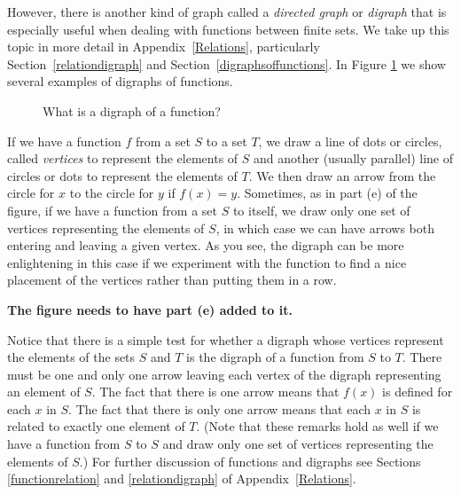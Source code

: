 However, there is another kind of graph called a {\em directed
  graph} or {\em
  digraph} that is
especially useful when dealing with functions between finite sets. We
take up this topic in more detail in Appendix~\ref{Relations},
particularly Section~\ref{relationdigraph} and Section~\ref{digraphsoffunctions}. In
Figure \ref{functiondigraphs} we show several examples of digraphs of functions.
\begin{figure}[hbt]\caption{What is a digraph of a
function?}\label{functiondigraphs}\smallskip
\begin{center}\end{center}
\end{figure}
If we have a function $f$ from a set $S$ to a set $T$, we draw a line
of dots or circles, called \emph{vertices} to represent the elements of $S$ and another
(usually parallel) line of circles or dots to represent the elements
of $T$.  We then draw an arrow from the circle for $x$ to the circle
for $y$ if $f(x) = y$. Sometimes, as in part (e) of the figure, if we
have a function from a set $S$ to itself, we draw only one set of
vertices representing the elements of $S$, in which case we can have
arrows both entering and leaving a given vertex. As you see, the
digraph can be more enlightening in this case if we experiment with
the function to find a nice placement of the vertices rather than
putting them in a row.

\textbf{The figure needs to have part (e) added to it.}



Notice that there is a simple test for whether a digraph whose vertices
represent the elements of the sets $S$ and $T$ is the digraph of a function
from $S$ to $T$.  There must be one and only one arrow leaving each vertex of
the digraph representing an element of $S$.  The fact that there is one arrow
means that $f(x)$ is defined for each $x$ in $S$.  The fact that there is
only one arrow means that each $x$ in $S$ is related to exactly one element of
$T$. (Note that these remarks hold as well if we have a function from
$S$ to $S$ and draw only one set of vertices representing the elements
of $S$.) For further discussion of functions and digraphs see Sections
\ref{functionrelation} and \ref{relationdigraph} of {Appendix~\ref{Relations}}.

